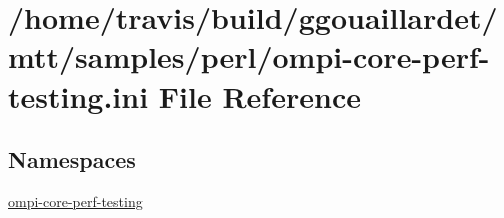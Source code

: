 \hypertarget{ompi-core-perf-testing_8ini}{\section{/home/travis/build/ggouaillardet/mtt/samples/perl/ompi-\/core-\/perf-\/testing.ini File Reference}
\label{ompi-core-perf-testing_8ini}
}
\subsection*{Namespaces}
\begin{DoxyCompactItemize}
\item 
\hyperlink{namespaceompi-core-perf-testing}{ompi-\/core-\/perf-\/testing}
\end{DoxyCompactItemize}

